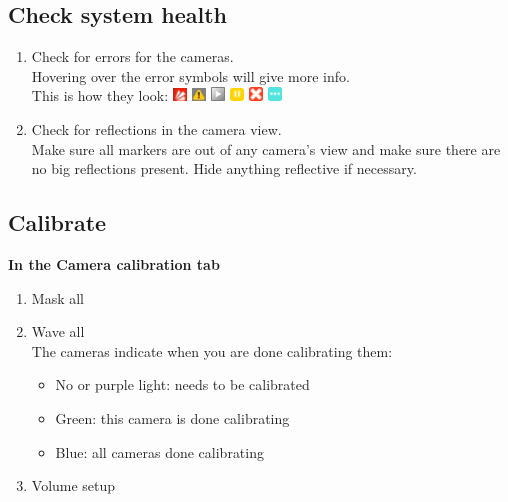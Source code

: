 \subsection{Check system health}
\begin{enumerate}
    \item Check for errors for the cameras.\\Hovering over the error symbols will give more info.\\This is how they look:
    \includegraphics[width=0.03\textwidth]{imgs/icons/icnBumped.png}
    \includegraphics[width=0.03\textwidth]{imgs/icons/icnCamError.png}
    \includegraphics[width=0.03\textwidth]{imgs/icons/icnConnectedNotContrib.png}
    \includegraphics[width=0.03\textwidth]{imgs/icons/icnDisabled.png}
    \includegraphics[width=0.03\textwidth]{imgs/icons/icnDisconnect.png}
    \includegraphics[width=0.03\textwidth]{imgs/icons/icnUncal.png}
    \item Check for reflections in the camera view.\\
    Make sure all markers are out of any camera's view and make sure there are no big reflections present. Hide anything reflective if necessary.
\end{enumerate}
\newpage
\subsection{Calibrate}
\textbf{In the Camera calibration tab}
\begin{enumerate}
    \item Mask all
    \item Wave all\\
    The cameras indicate when you are done calibrating them:
    \begin{itemize}
        \item No or purple light: needs to be calibrated
        \item Green: this camera is done calibrating
        \item Blue: all cameras done calibrating
    \end{itemize}
    \item Volume setup
\end{enumerate}


